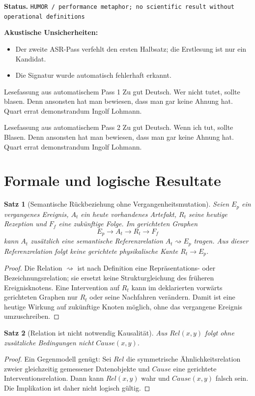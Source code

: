 \documentclass[11pt,a4paper]{article}
\newtheorem{satz}{Satz}
\newcommand{\status}[1]{\texttt{#1}}
\begin{document}
\textbf{Status.} \status{HUMOR / performance metaphor; no scientific result without operational definitions}

\textbf{Akustische Unsicherheiten:}
\begin{itemize}
\item Der zweite ASR-Pass verfehlt den ersten Halbsatz; die Erstlesung ist nur ein Kandidat.
\item Die Signatur wurde automatisch fehlerhaft erkannt.
\end{itemize}

\begin{asrbox}{Lesefassung aus automatischem Pass 1}
Zu gut Deutsch. Wer nicht tutet, sollte blasen. Denn ansonsten hat man bewiesen, dass man gar keine Ahnung hat. Quart errat demonstrandum Ingolf Lohmann.
\end{asrbox}

\begin{asrbox}{Lesefassung aus automatischem Pass 2}
Zu gut Deutsch. Wenn ich tut, sollte Blasen. Denn ansonsten hat man bewiesen, dass man gar keine Ahnung hat. Quart errat demonstrandum Ingolf Lohmann.
\end{asrbox}

\section{Formale und logische Resultate}

\begin{satz}[Semantische Rückbeziehung ohne Vergangenheitsmutation]
Seien $E_p$ ein vergangenes Ereignis, $A_t$ ein heute vorhandenes Artefakt, $R_t$ seine heutige Rezeption und $F_f$ eine zukünftige Folge. Im gerichteten Graphen
\[
E_p \longrightarrow A_t \longrightarrow R_t \longrightarrow F_f
\]
kann $A_t$ zusätzlich eine semantische Referenzrelation $A_t \rightsquigarrow E_p$ tragen. Aus dieser Referenzrelation folgt keine gerichtete physikalische Kante $R_t \to E_p$.
\end{satz}
\begin{proof}
Die Relation $\rightsquigarrow$ ist nach Definition eine Repräsentations- oder Bezeichnungsrelation; sie ersetzt keine Strukturgleichung des früheren Ereignisknotens. Eine Intervention auf $R_t$ kann im deklarierten vorwärts gerichteten Graphen nur $R_t$ oder seine Nachfahren verändern. Damit ist eine heutige Wirkung auf zukünftige Knoten möglich, ohne das vergangene Ereignis umzuschreiben.
\end{proof}

\begin{satz}[Relation ist nicht notwendig Kausalität]
Aus $Rel(x,y)$ folgt ohne zusätzliche Bedingungen nicht $Cause(x,y)$.
\end{satz}
\begin{proof}
Ein Gegenmodell genügt: Sei $Rel$ die symmetrische Ähnlichkeitsrelation zweier gleichzeitig gemessener Datenobjekte und $Cause$ eine gerichtete Interventionsrelation. Dann kann $Rel(x,y)$ wahr und $Cause(x,y)$ falsch sein. Die Implikation ist daher nicht logisch gültig.
\end{proof}
\end{document}
